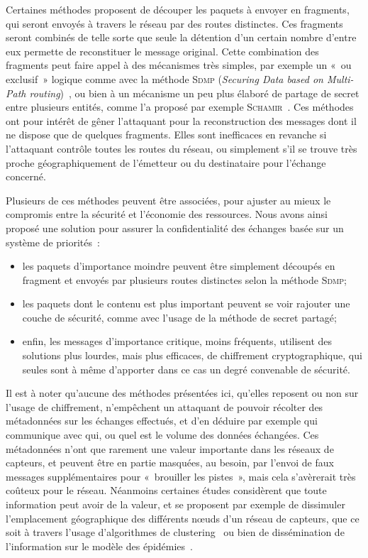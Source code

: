 Certaines méthodes proposent de découper les paquets à envoyer en fragments, qui seront envoyés à travers le réseau par des routes distinctes.
Ces fragments seront combinés de telle sorte que seule la détention d'un certain nombre d'entre eux permette de reconstituer le message original.
Cette combination des fragments peut faire appel à des mécanismes très simples, par exemple un « ou exclusif » logique comme avec la méthode \textsc{Sdmp} (\textit{Securing Data based on Multi-Path routing})~\cite{BM10}, ou bien à un mécanisme un peu plus élaboré de partage de secret entre plusieurs entités, comme l'a proposé par exemple \textsc{Schamir}~\cite{Sha79}.
Ces méthodes ont pour intérêt de gêner l'attaquant pour la reconstruction des messages dont il ne dispose que de quelques fragments.
Elles sont inefficaces en revanche si l'attaquant contrôle toutes les routes du réseau, ou simplement s'il se trouve très proche géographiquement de l'émetteur ou du destinataire pour l'échange concerné.

Plusieurs de ces méthodes peuvent être associées, pour ajuster au mieux le compromis entre la sécurité et l'économie des ressources.
Nous avons ainsi proposé une solution pour assurer la confidentialité des échanges basée sur un système de priorités~\cite{MMB13}:
\begin{itemize}
    \item les paquets d'importance moindre peuvent être simplement découpés en fragment et envoyés par plusieurs routes distinctes selon la méthode \textsc{Sdmp};
    \item les paquets dont le contenu est plus important peuvent se voir rajouter une couche de sécurité, comme avec l'usage de la méthode de secret partagé;
    \item enfin, les messages d'importance critique, moins fréquents, utilisent des solutions plus lourdes, mais plus efficaces, de chiffrement cryptographique, qui seules sont à même d'apporter dans ce cas un degré convenable de sécurité.
\end{itemize}

Il est à noter qu'aucune des méthodes présentées ici, qu'elles reposent ou non sur l'usage de chiffrement, n'empêchent un attaquant de pouvoir récolter des métadonnées sur les échanges effectués, et d'en déduire par exemple qui communique avec qui, ou quel est le volume des données échangées.
Ces métadonnées n'ont que rarement une valeur importante dans les réseaux de capteurs, et peuvent être en partie masquées, au besoin, par l'envoi de faux messages supplémentaires pour « brouiller les pistes », mais cela s'avèrerait très coûteux pour le réseau.
Néanmoins certaines études considèrent que toute information peut avoir de la valeur, et se proposent par exemple de dissimuler l'emplacement géographique des différents nœuds d'un réseau de capteurs, que ce soit à travers l'usage d'algorithmes de clustering~\cite{GK13} ou bien de dissémination de l'information sur le modèle des épidémies~\cite{KDA14}.


